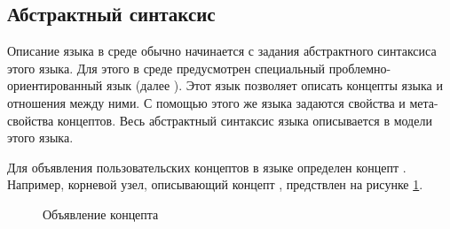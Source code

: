 \subsection{Абстрактный синтаксис}
Описание языка в среде \MPS{} обычно начинается с задания абстрактного синтаксиса \cite{redDragon} этого языка. Для этого в среде \MPS{} предусмотрен специальный проблемно-ориентированный язык  (далее ). Этот язык позволяет описать концепты языка и отношения между ними. С помощью этого же языка задаются свойства и мета-свойства концептов. Весь абстрактный синтаксис языка описывается в модели  этого языка.

Для объявления пользовательских концептов в языке  определен концепт . Например, корневой узел, описывающий концепт , предствлен на рисунке \ref{fig:StateMachineConcept}.

\begin{figure}
\centering
{}
\caption{Объявление концепта }
\label{fig:StateMachineConcept}
\end{figure}


